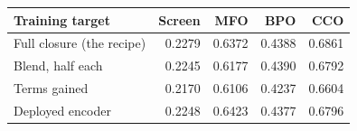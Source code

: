 \begin{tabular}{lrrrr}
\toprule
    \textbf{Training target} & \textbf{Screen} & \textbf{MFO} & \textbf{BPO} & \textbf{CCO} \\
\midrule
    Full closure (the recipe) & 0.2279 & 0.6372 & 0.4388 & 0.6861 \\
    Blend, half each & 0.2245 & 0.6177 & 0.4390 & 0.6792 \\
    Terms gained & 0.2170 & 0.6106 & 0.4237 & 0.6604 \\
    Deployed encoder & 0.2248 & 0.6423 & 0.4377 & 0.6796 \\
\bottomrule
\end{tabular}
